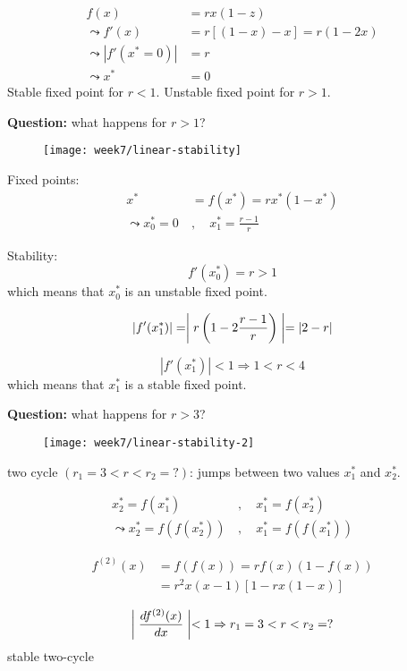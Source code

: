 \begin{align}
f(x) &= rx(1-z) \\
\leadsto
f'(x) &= r[(1-x)-x]=r(1-2x) \\
\leadsto
|f'(x^*=0)|&=r\\
\leadsto
x^* &= 0
\end{align}
Stable fixed point for $r<1$. Unstable fixed point for $r>1$.

\textbf{Question:} what happens for $r>1$?
\begin{figure}[h]
    \centering
    \texttt{[image: week7/linear-stability]}\\
    \caption{}
    \label{fig:linear-stability}
\end{figure}

Fixed points:
\begin{align}
x^* &= f(x^*) = rx^*(1-x^*)\\
\leadsto
x_0^*=0\ &,\quad x_1^* = \frac{r-1}{r}
\end{align} 

Stability:
\begin{equation}
f'(x_0^*) = r>1
\end{equation}
which means that $x_0^*$ is an unstable fixed point.

\begin{equation}
|f'(x_1^*)|=\biggm\vert r\left(1-2\frac{r-1}{r}\right)\biggm\vert=|2-r|
\end{equation}

\begin{equation}
|f'(x_1^*)| < 1 \Rightarrow 1<r<4
\end{equation}
which means that $x_1^*$ is a stable fixed point.

\textbf{Question:} what happens for $r>3$?

\begin{figure}[p]
    \centering
    \texttt{[image: week7/linear-stability-2]}\\
    \caption{}
    \label{fig:linear-stability-2}
\end{figure}

\begin{framed}
two cycle $(r_1=3<r<r_2=?)$: jumps between two values $x_1^*$ and $x_2^*$.

\begin{align}
x_2^*=f(x_1^*)\ &,\quad x_1^*=f(x_2^*) \\
\leadsto
x_2^* = f(f(x_2^*))\, &,\quad x_1^*=f(f(x_1^*))
\end{align}

\begin{align}
f^{(2)}(x) &= f(f(x)) = rf(x)(1-f(x))\\
&= r^2x(x-1)[1-rx(1-x)]
\end{align}

\begin{equation}
\biggm\vert\frac{d f^{(2)}(x)}{d x}\biggm\vert<1 \Rightarrow r_1=3<r<r_2=?
\end{equation}
stable two-cycle
\end{framed}

